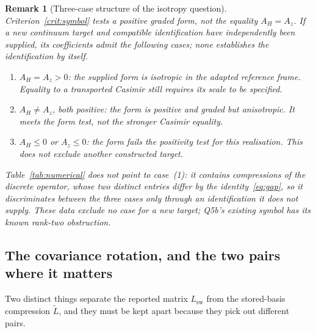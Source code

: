 \documentclass[11pt,a4paper]{article}
\newtheorem{remark}[theorem]{Remark}
\begin{document}
    \begin{remark}[Three-case structure of the isotropy question]
      \label{rem:threecases}
      Criterion~\ref{crit:symbol} tests a positive graded form, not the equality $A_H=A_z$.
      If a new continuum target and compatible identification have independently been supplied,
      its coefficients admit the following cases; none establishes the identification by itself.
      \begin{enumerate}
        \item $A_H=A_z>0$: the supplied form is isotropic in the adapted reference frame.
        Equality to a transported Casimir still requires its scale to be specified.
        \item $A_H\neq A_z$, both positive: the form is positive and graded but anisotropic.
        It meets the form test, not the stronger Casimir equality.
        \item $A_H\leq0$ or $A_z\leq0$: the form fails the positivity test for this realisation.
        This does not exclude another constructed target.
      \end{enumerate}
      Table~\ref{tab:numerical} does not point to case~(1): it contains compressions of the
      discrete operator, whose
      two distinct entries differ by the identity~\eqref{eq:gap}, so it discriminates between the
      three cases only through an identification it does not supply.
      These data exclude no case for a new target; Q5b's existing symbol has its known rank-two obstruction.
    \end{remark}

  \subsection{The covariance rotation, and the two pairs where it matters}
    \label{ssec:rotation}

    Two distinct things separate the reported matrix $L_{\mathrm{sw}}$ from the stored-basis
    compression $\tilde L$, and they must be kept apart because they pick out different pairs.
\end{document}
